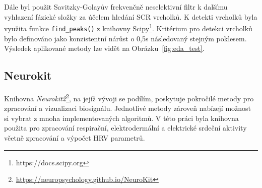 Dále byl použit Savitzky-Golayův frekvenčně neselektivní filtr k dalšímu
vyhlazení fázické složky za účelem hledání \gls{SCR} vrcholků. K detekti
vrcholků byla využita funkce \texttt{find\_peaks()} z knihovny
Scipy\footnote{https://docs.scipy.org}. Kritérium pro detekci vrcholků bylo
definováno jako konzistentní nárůst o 0,5s následovaný stejným poklesem.
Výsledek aplikované metody lze vidět na Obrázku~\ref{fig:eda_test}.

\subsection{Neurokit}
\label{subsec:neurokit}
Knihovna \textit{Neurokit2}\footnote{\url{https://neuropsychology.github.io/NeuroKit}},
na jejíž vývoji se podílím, poskytuje pokročilé metody pro zpracování a
vizualizaci biosignálu. Jednotlivé metody zároveň nabízejí možnost si vybrat z
mnoha implementovaných algoritmů. V této práci byla knihovna použita pro
zpracování respirační, elektrodermální a elektrické srdeční aktivity včetně
zpracování a výpočet \gls{HRV} parametrů.

